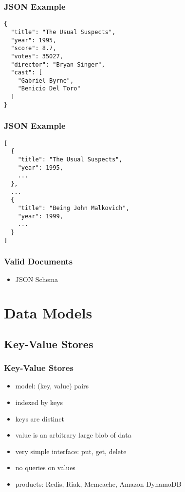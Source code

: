 \documentclass[dvipsnames]{beamer}
\theoremstyle{plain}
\begin{document}
\begin{frame}[fragile]
  \frametitle{JSON Example}

  \begin{lstlisting}
{
  "title": "The Usual Suspects",
  "year": 1995,
  "score": 8.7,
  "votes": 35027,
  "director": "Bryan Singer",
  "cast": [
    "Gabriel Byrne",
    "Benicio Del Toro"
  ]
}
  \end{lstlisting}
\end{frame}

\begin{frame}[fragile]
  \frametitle{JSON Example}

  \begin{lstlisting}
[
  {
    "title": "The Usual Suspects",
    "year": 1995,
    ...
  },
  ...
  {
    "title": "Being John Malkovich",
    "year": 1999,
    ...
  }
]
  \end{lstlisting}
\end{frame}

\begin{frame}
  \frametitle{Valid Documents}

  \begin{itemize}
    \item JSON Schema
  \end{itemize}
\end{frame}

\section{Data Models}

\subsection{Key-Value Stores}

\begin{frame}
  \frametitle{Key-Value Stores}

  \begin{itemize}
    \item model: (key, value) pairs
    \item indexed by keys
    \item keys are \alert{distinct}
    \item value is an arbitrary large blob of data

    \pause
    \medskip
    \item very simple interface: put, get, delete
    \item no queries on values

    \pause
    \bigskip
    \item products: Redis, Riak, Memcache, Amazon DynamoDB
  \end{itemize}
\end{frame}
\end{document}
